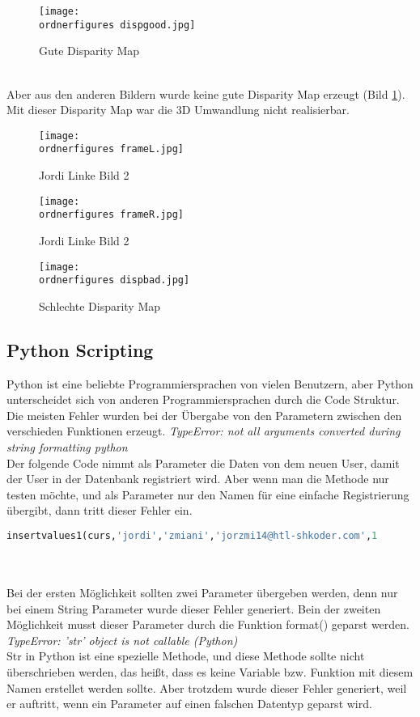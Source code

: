\begin{figure}[!htb]
  \centering
    \texttt{[image: \\ordnerfigures dispgood.jpg]}
      \caption{Gute Disparity Map}
\end{figure}\\
Aber aus den anderen Bildern wurde keine gute Disparity Map erzeugt (Bild \ref{fig:baddm}). Mit dieser Disparity Map war die 3D Umwandlung nicht realisierbar.
\begin{figure}[!htb]
   \begin{minipage}{0.48\textwidth}
     \centering
     \texttt{[image: \\ordnerfigures frameL.jpg]}
     \caption{Jordi Linke Bild 2}
   \end{minipage}\hfill
   \begin{minipage}{0.48\textwidth}
     \centering
     \texttt{[image: \\ordnerfigures frameR.jpg]}
     \caption{Jordi Linke Bild 2}
   \end{minipage}
\end{figure}
\begin{figure}[!htb]
  \centering
    \texttt{[image: \\ordnerfigures dispbad.jpg]}
      \caption{Schlechte Disparity Map}
      \label{fig:baddm}
\end{figure}
\newpage
\subsection{Python Scripting}
Python ist eine beliebte Programmiersprachen von vielen Benutzern, aber Python unterscheidet sich von anderen Programmiersprachen durch die Code Struktur. Die meisten Fehler wurden bei der Übergabe von den Parametern zwischen den verschieden Funktionen erzeugt.
\bigbreak
\textit{TypeError: not all arguments converted during string formatting python}\\
Der folgende Code nimmt als Parameter die Daten von dem neuen User, damit der User in der Datenbank registriert wird. Aber wenn man die Methode nur testen möchte, und als Parameter nur den Namen für eine einfache Registrierung übergibt, dann tritt dieser Fehler ein. \\
\begin{lstlisting}[language=Python]
insertvalues1(curs,'jordi','zmiani','jorzmi14@htl-shkoder.com',1
\end{lstlisting}
\\\\
Bei der ersten Möglichkeit sollten zwei Parameter übergeben werden, denn nur bei einem String Parameter wurde dieser Fehler generiert.
Bein der zweiten Möglichkeit musst dieser Parameter durch die Funktion format()  geparst werden.
\bigbreak
\textit{TypeError: 'str' object is not callable (Python)}\\
Str in Python ist eine spezielle Methode, und diese Methode sollte nicht überschrieben werden, das heißt, dass es keine Variable bzw. Funktion mit diesem Namen erstellet werden  sollte. Aber trotzdem wurde dieser Fehler generiert, weil er auftritt, wenn ein Parameter auf einen falschen Datentyp geparst wird.

